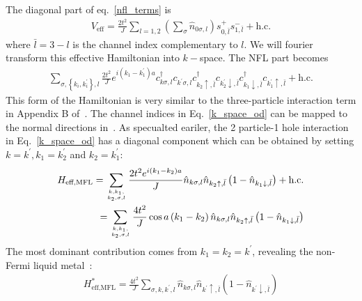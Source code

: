 \documentclass[12pt]{revtex4-2}
\begin{document}
The diagonal part of eq.~\ref{nfl_terms} is
\begin{equation}\begin{aligned}
	V_\text{eff} = \frac{2t^2}{J}\sum_{l=1,2}\left(\sum_\sigma \hat n_{0\sigma,l}\right) s^+_{0,\bar l}s^-_{1,\bar l} + \text{h.c.}
\end{aligned}\end{equation}
where \(\bar l = 3 - l\) is the channel index complementary to \(l\). We will fourier transform this effective Hamiltonian into \(k-\)space. The NFL part becomes
\begin{equation}\begin{aligned}
	\label{k_space_od}
	\sum_{\sigma, \left\{k_i,k_i^\prime\right\},l} \frac{2t^2}{J}e^{i\left(k_1 - k_1^\prime\right)a}c^\dagger_{k\sigma,l}c_{k^\prime\sigma,l}c^\dagger_{k_2 \uparrow, \bar l}c_{k_2^\prime \downarrow,\bar l}c^\dagger_{k_1 \downarrow,\bar l}c_{k_1^\prime \uparrow, \bar l} + \text{h.c.} 
\end{aligned}\end{equation}
This form of the Hamiltonian is very similar to the three-particle interaction term in Appendix B of~\cite{anirbanmott1}. The channel indices in Eq.~\ref{k_space_od} can be mapped to the normal directions in~\cite{anirbanmott1}. As specualted eariler, the 2 particle-1 hole interaction in Eq.~\ref{k_space_od} has a diagonal component which can be obtained by setting \(k=k^\prime, k_1 = k_2^\prime\) and \(k_2 = k_1^\prime\):
\begin{equation}\begin{aligned}
	H_\text{eff,MFL} = \sum_{k, k_1, \atop{k_2,\sigma,  l}} \frac{2t^2e^{i\left(k_1 - k_2\right)a}}{J} \hat n_{k\sigma,l} \hat n_{k_2 \uparrow, \bar l}\left(1 - \hat n_{k_1 \downarrow,\bar l}\right) + \text{h.c.}\\
	= \sum_{k, k_1, \atop{k_2,\sigma,  l}} \frac{4t^2}{J} \cos a\left(k_1 - k_2\right)  \hat n_{k\sigma,l} \hat n_{k_2 \uparrow, \bar l}\left(1 - \hat n_{k_1 \downarrow,\bar l}\right)
\end{aligned}\end{equation}
The most dominant contribution comes from \(k_1 = k_2 = k^\prime\), revealing the non-Fermi liquid metal~\cite{cox_jarrell_two_channel_rev,andrei_jerez_1995}:
\begin{equation}\begin{aligned}
	\label{mfl_large}
	H^*_\text{eff,MFL} = \frac{4t^2}{J} \sum_{\sigma, k, k^\prime, l} \hat n_{k\sigma,l} \hat n_{k^\prime \uparrow, \bar l}\left(1 - \hat n_{k^\prime \downarrow,\bar l}\right)
\end{aligned}\end{equation}
\end{document}
